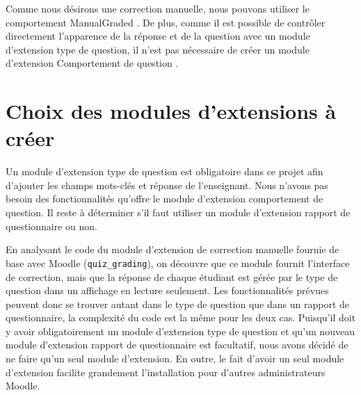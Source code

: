 Comme nous désirons une correction manuelle, nous pouvons utiliser le comportement \og ManualGraded \fg{}.
De plus, comme il est possible de contrôler directement l'apparence de la réponse et de la question avec un module d'extension type de question, il n'est pas nécessaire de créer un module d'extension \og Comportement de question \fg{}.

\section{Choix des modules d'extensions à créer}

Un module d'extension type de question est obligatoire dans ce projet afin d'ajouter les champs mots-clés et réponse de l'enseignant.
Nous n'avons pas besoin des fonctionnalités qu'offre le module d'extension comportement de question.
Il reste à déterminer s'il faut utiliser un module d'extension rapport de questionnaire ou non.

En analysant le code du module d'extension de correction manuelle fournie de base avec Moodle (\texttt{quiz\_grading}), on découvre que ce module fournit l'interface de correction, mais que la réponse de chaque étudiant est gérée par le type de question dans un affichage en lecture seulement.
Les fonctionnalités prévues peuvent donc se trouver autant dans le type de question que dans un rapport de questionnaire, la complexité du code est la même pour les deux cas.
Puisqu'il doit y avoir obligatoirement un module d'extension type de question et qu'un nouveau module d'extension rapport de questionnaire est facultatif, nous avons décidé de ne faire qu'un seul module d'extension.
En outre, le fait d'avoir un seul module d'extension facilite grandement l'installation pour d'autres administrateurs Moodle.
